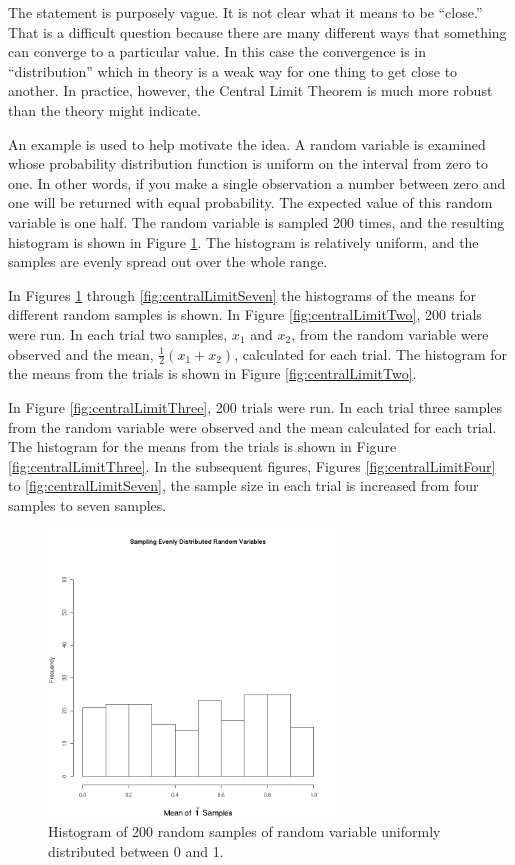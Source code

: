 \documentclass[12pt]{article}
\begin{document}
The statement is purposely vague. It is not clear what it means to be
``close.'' That is a difficult question because there are many
different ways that something can converge to a particular value. In
this case the convergence is in ``distribution'' which in theory is a
weak way for one thing to get close to another. In practice, however,
the Central Limit Theorem is much more robust than the theory might
indicate.

An example is used to help motivate the idea. A random variable is
examined whose probability distribution function is uniform on the
interval from zero to one. In other words, if you make a single
observation a number between zero and one will be returned with equal
probability. The expected value of this random variable is one half.
The random variable is sampled 200 times, and the resulting histogram
is shown in Figure \ref{fig:centralLimitOne}.  The histogram is
relatively uniform, and the samples are evenly spread out over the
whole range.

In Figures \ref{fig:centralLimitOne} through
\ref{fig:centralLimitSeven} the histograms of the means for different
random samples is shown. In Figure \ref{fig:centralLimitTwo}, 200
trials were run. In each trial two samples, $x_1$ and $x_2$, from the
random variable were observed and the mean, $\frac{1}{2}\left( x_1 +
  x_2 \right)$, calculated for each trial.  The histogram for the
means from the trials is shown in Figure \ref{fig:centralLimitTwo}.

In Figure \ref{fig:centralLimitThree}, 200 trials were run. In each
trial three samples from the random variable were observed and the
mean calculated for each trial. The histogram for the means from the
trials is shown in Figure \ref{fig:centralLimitThree}. In the
subsequent figures, Figures \ref{fig:centralLimitFour} to
\ref{fig:centralLimitSeven}, the sample size in each trial is
increased from four samples to seven samples.

\begin{figure}[htp]
  \centerline{\includegraphics[height=3in]{centralLimit1}}
  \caption{Histogram of 200 random samples of random variable
    uniformly distributed between 0 and 1.}
  \label{fig:centralLimitOne}
\end{figure}
\end{document}
